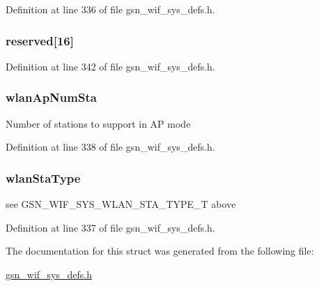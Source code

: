 Definition at line 336 of file gsn\_\-wif\_\-sys\_\-defs.h.

\hypertarget{a00353_ab6636d92a45a0b1933fe21f421453f22}{
\subsubsection[{reserved}]{ {\bf reserved}\mbox{[}16\mbox{]}}}
\label{a00353_ab6636d92a45a0b1933fe21f421453f22}


Definition at line 342 of file gsn\_\-wif\_\-sys\_\-defs.h.

\hypertarget{a00353_aaade074f9f5d2a057d4c1c1a98b1dc5d}{
\subsubsection[{wlanApNumSta}]{ {\bf wlanApNumSta}}}
\label{a00353_aaade074f9f5d2a057d4c1c1a98b1dc5d}
Number of stations to support in AP mode 

Definition at line 338 of file gsn\_\-wif\_\-sys\_\-defs.h.

\hypertarget{a00353_a99a9e67e9bebdcb1824766965c98af8f}{
\subsubsection[{wlanStaType}]{ {\bf wlanStaType}}}
\label{a00353_a99a9e67e9bebdcb1824766965c98af8f}
see GSN\_\-WIF\_\-SYS\_\-WLAN\_\-STA\_\-TYPE\_\-T above 

Definition at line 337 of file gsn\_\-wif\_\-sys\_\-defs.h.



The documentation for this struct was generated from the following file:\begin{DoxyCompactItemize}
\item 
\hyperlink{a00612}{gsn\_\-wif\_\-sys\_\-defs.h}\end{DoxyCompactItemize}
